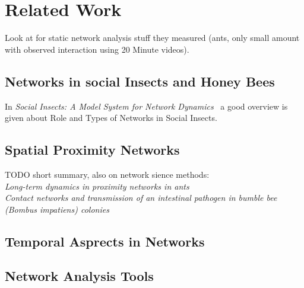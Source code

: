 \chapter{Related Work}

Look at \cite{quevillon2015social} for static network analysis stuff they measured (ants, only small amount with observed interaction using 20 Minute videos).

\section{Networks in social Insects and Honey Bees}

In \emph{Social Insects: A Model System for Network Dynamics}~\cite{charbonneau2013social} a good overview is given about Role and Types of Networks in Social Insects.

\section{Spatial Proximity Networks}

TODO short summary, also on network sience methods:\\
\emph{Long-term dynamics in proximity networks in ants}~\cite{jeanson2012long}\\

\emph{Contact networks and transmission of an intestinal pathogen in bumble bee (Bombus impatiens) colonies}~\cite{otterstatter2007contact}

\section{Temporal Asprects in Networks}

\section{Network Analysis Tools}